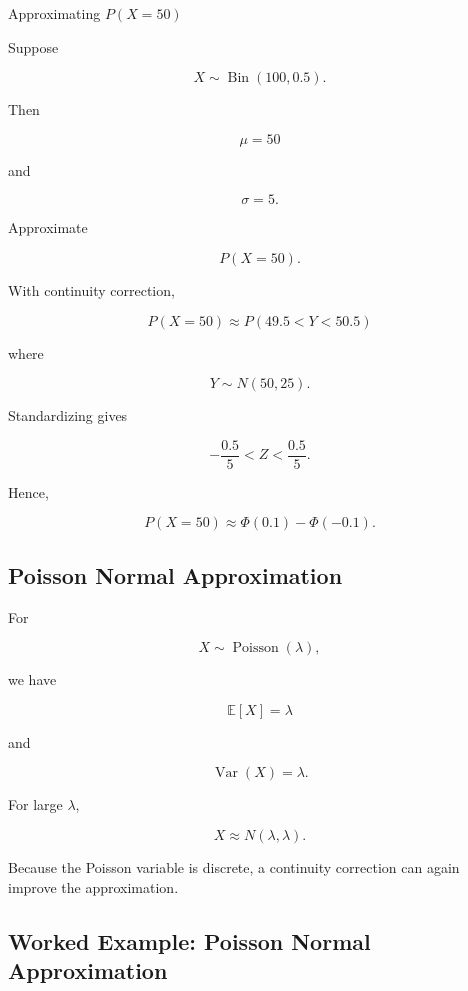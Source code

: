\begin{workedexamplebox}{Approximating \(P(X=50)\)}

Suppose

\[
X
\sim
\operatorname{Bin}(100,0.5).
\]

Then

\[
\mu=50
\]

and

\[
\sigma=5.
\]

Approximate

\[
P(X=50).
\]

With continuity correction,

\[
P(X=50)
\approx
P(49.5<Y<50.5)
\]

where

\[
Y\sim N(50,25).
\]

Standardizing gives

\[
-\frac{0.5}{5}
<
Z
<
\frac{0.5}{5}.
\]

Hence,

\begin{answerbox}
\[
\boxed{
P(X=50)
\approx
\Phi(0.1)-\Phi(-0.1).
}
\]
\end{answerbox}

\end{workedexamplebox}

\subsection{Poisson Normal Approximation}
\label{subsec:poisson-normal-approximation}

For

\[
X\sim\operatorname{Poisson}(\lambda),
\]

we have

\[
\mathbb{E}[X]=\lambda
\]

and

\[
\operatorname{Var}(X)=\lambda.
\]

For large \(\lambda\),

\[
\boxed{
X
\approx
N(\lambda,\lambda).
}
\]

Because the Poisson variable is discrete, a continuity correction can
again improve the approximation.

\subsection{Worked Example: Poisson Normal Approximation}
\label{subsec:worked-poisson-normal}

